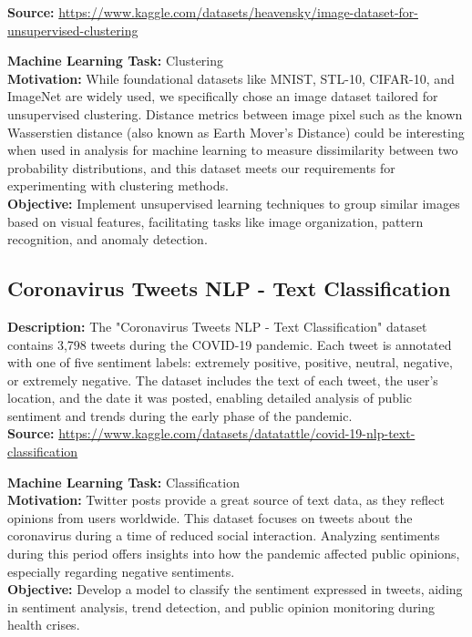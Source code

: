 \documentclass{article}
\begin{document}
\textbf{Source:} \href{https://www.kaggle.com/datasets/heavensky/image-dataset-for-unsupervised-clustering}{https://www.kaggle.com/datasets/heavensky/image-dataset-for-unsupervised-clustering}


\textbf{Machine Learning Task:} Clustering \\

\textbf{Motivation:} While foundational datasets like MNIST, STL-10, CIFAR-10, and ImageNet are widely used, we specifically chose an image dataset tailored for unsupervised clustering. Distance metrics between image pixel such as the known Wasserstien distance (also known as Earth Mover’s Distance) could be interesting when used in analysis for machine learning to measure dissimilarity between two probability distributions, and this dataset meets our requirements for experimenting with clustering methods. \\

\textbf{Objective:} Implement unsupervised learning techniques to group similar images based on visual features, facilitating tasks like image organization, pattern recognition, and anomaly detection.

\subsection{Coronavirus Tweets NLP - Text Classification}
\textbf{Description:} The "Coronavirus Tweets NLP - Text Classification" dataset contains 3,798 tweets during the COVID-19 pandemic. Each tweet is annotated with one of five sentiment labels: extremely positive, positive, neutral, negative, or extremely negative. The dataset includes the text of each tweet, the user's location, and the date it was posted, enabling detailed analysis of public sentiment and trends during the early phase of the pandemic. \\

\textbf{Source:}
\href{https://www.kaggle.com/datasets/datatattle/covid-19-nlp-text-classification}{https://www.kaggle.com/datasets/datatattle/covid-19-nlp-text-classification}


\textbf{Machine Learning Task:} Classification \\

\textbf{Motivation:} Twitter posts provide a great source of text data, as they reflect opinions from users worldwide. This dataset focuses on tweets about the coronavirus during a time of reduced social interaction. Analyzing sentiments during this period offers insights into how the pandemic affected public opinions, especially regarding negative sentiments. \\


\textbf{Objective:} Develop a model to classify the sentiment expressed in tweets, aiding in sentiment analysis, trend detection, and public opinion monitoring during health crises.
\end{document}
